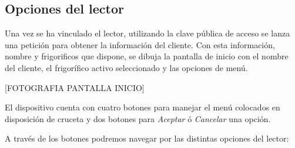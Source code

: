 \subsection{Opciones del lector}

Una vez se ha vinculado el lector, utilizando la clave pública de acceso se lanza una petición para obtener la información del cliente. Con esta información, nombre y frigorificos que dispone, se dibuja la pantalla de inicio con el nombre del cliente, el frigorífico activo seleccionado y las opciones de menú.

    [FOTOGRAFIA PANTALLA INICIO]

El dispositivo cuenta con cuatro botones para manejar el menú colocados en disposición de cruceta y dos botones para \emph{Aceptar} ó \emph{Cancelar} una opción.

A través de los botones podremos navegar por las distintas opciones del lector:

